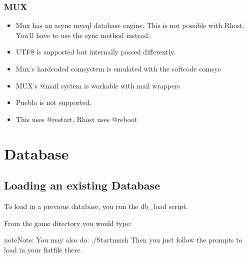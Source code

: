 \documentclass[letterpaper,10pt,english]{sphinxmanual}
\begin{document}
\subsection{MUX}
\label{\detokenize{differences:mux}}\begin{itemize}
\item {} 
\sphinxAtStartPar
Mux has an async mysql database engine.  This is not possible with Rhost.  You’ll have to use the sync method instead.

\item {} 
\sphinxAtStartPar
UTF8 is supported but internally passed differently.

\item {} 
\sphinxAtStartPar
Mux’s hardcoded comsystem is emulated with the softcode comsys

\item {} 
\sphinxAtStartPar
MUX’s @mail system is workable with mail wrappers

\item {} 
\sphinxAtStartPar
Pueblo is not supported.

\item {} 
\sphinxAtStartPar
This uses @restart, Rhost uses @reboot

\end{itemize}


\chapter{Database}
\label{\detokenize{database:database}}\label{\detokenize{database::doc}}

\section{Loading an existing Database}
\label{\detokenize{database:loading-an-existing-database}}
\sphinxAtStartPar
To load in a previous database, you run the db\_load script.

\sphinxAtStartPar
From the game directory you would type:

\begin{sphinxVerbatim}[commandchars=\\\{\}]
   
\end{sphinxVerbatim}

\begin{sphinxadmonition}{note}{Note:}
\sphinxAtStartPar
You may also do: ./Startmush
Then you just follow the prompts to load in your flatfile there.
\end{sphinxadmonition}
\end{document}
